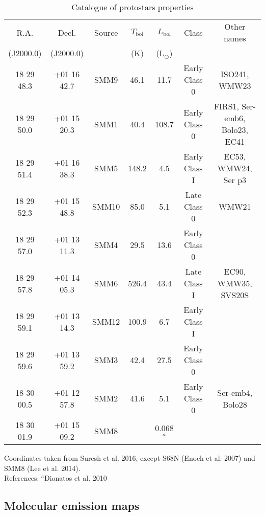 \documentclass{aa}
\begin{document}
\begin{table*}
\caption{Catalogue of protostars properties}             %
\label{table:2}      %
\centering                          %
\begin{tabular}{c c c c c c c} 
\hline\hline 
R.A. & Decl. & Source & $T_\mathrm{bol}$ &  $L_\mathrm{bol}$  & Class & Other names\\
 (J2000.0) & (J2000.0) & & (K) & (L$_\odot$) & &\\
\hline  

18 29 48.3 & +01 16 42.7 & SMM9 & 46.1 & 11.7 & Early Class 0 & ISO241, WMW23\\

18 29 50.0 & +01 15 20.3 & SMM1 & 40.4 & 108.7 & Early Class 0 & FIRS1, Ser-emb6, Bolo23, EC41\\

18 29 51.4 & +01 16 38.3 & SMM5 & 148.2 & 4.5 & Early Class I & EC53, WMW24, Ser p3 \\

18 29 52.3 & +01 15 48.8 & SMM10 & 85.0 & 5.1 & Late Class 0 & WMW21\\

18 29 57.0 & +01 13 11.3 & SMM4 & 29.5 & 13.6 & Early Class 0 &\\

18 29 57.8 & +01 14 05.3 & SMM6 & 526.4 & 43.4 & Late Class I & EC90, WMW35, SVS20S \\

18 29 59.1 & +01 13 14.3 & SMM12 & 100.9 & 6.7 & Early Class I &\\

18 29 59.6 & +01 13 59.2 & SMM3 & 42.4 & 27.5 & Early Class 0 & \\

18 30 00.5 & +01 12 57.8 & SMM2 & 41.6 & 5.1 & Early Class 0 & Ser-emb4, Bolo28\\

18 30 01.9 & +01 15 09.2 & SMM8 & & 0.068$^a$ & &\\
\hline
\end{tabular}
\begin{flushleft}
Coordinates taken from Suresh et al. 2016, except S68N (Enoch et al. 2007) and SMM8 (Lee et al. 2014).\\
References: $^a$Dionatos et al. 2010
\end{flushleft}
\end{table*}

\subsection{Molecular emission maps}
\end{document}
